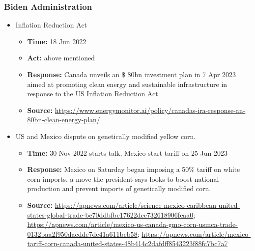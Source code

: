 		\subsubsection{Biden Administration}
			\begin{itemize}
			\item	Inflation Reduction Act
				\begin{itemize}
				\item \textbf{Time: } 18 Jun 2022
				\item \textbf{Act: } above mentioned
				\item \textbf{Response: } Canada unveils an \$ 80bn investment plan in 7 Apr 2023 aimed at promoting clean energy and sustainable infrastructure in response to the US Inflation Reduction Act.
				\item	\textbf{Source: }\url{https://www.energymonitor.ai/policy/canadas-ira-response-an-80bn-clean-energy-plan/}
				\end{itemize}
			\item US and Mexico dispute on genetically modified yellow corn.
				\begin{itemize}
				\item \textbf{Time: }30 Nov 2022 starts talk, Mexico start tariff on 25 Jun 2023
				\item \textbf{Response: }Mexico on Saturday began imposing a 50\% tariff on white corn imports, a move the president says looks to boost national production and prevent imports of genetically modified corn.
				\item	\textbf{Source: }\url{https://apnews.com/article/science-mexico-caribbean-united-states-global-trade-be70ddbfbc17622dcc732618906feaa0}; \url{https://apnews.com/article/mexico-us-canada-gmo-corn-usmca-trade-0132baa2f950dacdde7de41a611bcb58}; \url{https://apnews.com/article/mexico-tariff-corn-canada-united-states-48b414c2dafdff8543223f88fc7bc7a7}
				\end{itemize}

			\end{itemize}
	
